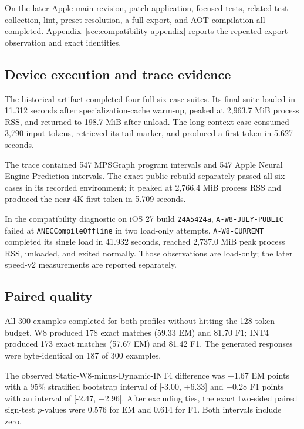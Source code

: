 \documentclass[10pt]{article}
\DeclareRobustCommand{\evidence}[1]{}
\DeclareRobustCommand{\artifact}[1]{\nolinkurl{#1}}
\begin{document}


On the later Apple-main revision, patch application, focused tests, related test collection, lint, preset resolution, a full export, and AOT compilation all completed.\evidence{CL-05,CL-28} Appendix~\ref{sec:compatibility-appendix} reports the repeated-export observation and exact identities.\evidence{CL-29}

\subsection{Device execution and trace evidence}

The historical artifact completed four full six-case suites. Its final suite loaded in 11.312 seconds after specialization-cache warm-up, peaked at 2,963.7 MiB process RSS, and returned to 198.7 MiB after unload.\evidence{CL-08} The long-context case consumed 3,790 input tokens, retrieved its tail marker, and produced a first token in 5.627 seconds.\evidence{CL-08}

The trace contained 547 MPSGraph program intervals and 547 Apple Neural Engine Prediction intervals.\evidence{CL-09} The exact public rebuild separately passed all six cases in its recorded environment; it peaked at 2,766.4 MiB process RSS and produced the near-4K first token in 5.709 seconds.\evidence{CL-10}

In the compatibility diagnostic on iOS 27 build \artifact{24A5424a}, \artifact{A-W8-JULY-PUBLIC} failed at \artifact{ANECCompileOffline} in two load-only attempts. \artifact{A-W8-CURRENT} completed its single load in 41.932 seconds, reached 2,737.0 MiB peak process RSS, unloaded, and exited normally. Those observations are load-only; the later speed-v2 measurements are reported separately.\evidence{CL-28}



\subsection{Paired quality}

All 300 examples completed for both profiles without hitting the 128-token budget. W8 produced 178 exact matches (59.33 EM) and 81.70 F1; INT4 produced 173 exact matches (57.67 EM) and 81.42 F1.\evidence{CL-13} The generated responses were byte-identical on 187 of 300 examples.\evidence{CL-13}

The observed Static-W8-minus-Dynamic-INT4 difference was +1.67 EM points with a 95\% stratified bootstrap interval of [-3.00, +6.33] and +0.28 F1 points with an interval of [-2.47, +2.96].\evidence{CL-14} After excluding ties, the exact two-sided paired sign-test $p$-values were 0.576 for EM and 0.614 for F1.\evidence{CL-14} Both intervals include zero.
\end{document}
